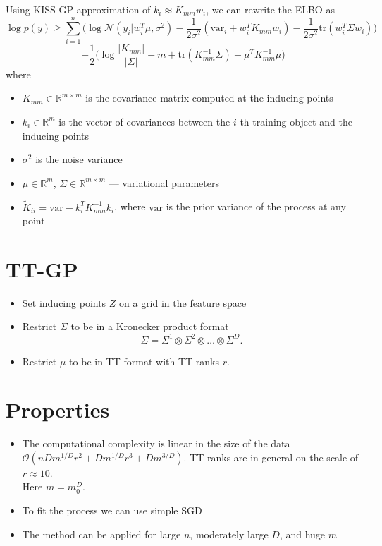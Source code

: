 \documentclass[a0,portrait]{a0poster}
\newcommand{\R}{\mathbb{R}}
\newcommand{\N}{\mathcal{N}}
\newcommand{\bigO}{\mathcal{O}}
\newcommand{\tr}{\mbox{tr}}
\begin{document}
\begin{multicols}{2}
Using KISS-GP approximation of $k_i \approx K_{mm} w_i$, we can rewrite the 
ELBO as
\[
  \log p(y) \ge \sum_{i=1}^n \bigg(\log \N (y_i | w_i^T \mu, \sigma^2) - 
  \frac 1 {2 \sigma^2} (\mbox{var}_i + w_i^T K_{mm} w_i) -\frac 1 {2 \sigma^2} 
    \tr (w_i^T \Sigma w_i)\bigg)
\]
\[
  - \frac 1 2 \bigg(\log \frac {|K_{mm}|} {|\Sigma|} - m + \tr(K_{mm}^{-1} \Sigma)
  + \mu^T K_{mm}^{-1}\mu \bigg)
\]
where
\begin{itemize}
  \item $K_{mm} \in \R^{m \times m}$ is the covariance matrix computed at the
    inducing points
  \item $k_i \in \R^m$ is the vector of covariances between the $i$-th training
    object and the inducing points
  \item $\sigma^2$ is the noise variance
  \item $\mu \in \R^m$, $\Sigma \in \R^{m \times m}$ — variational parameters
  \item $\tilde K_{ii} = \mbox{var} - k_i^T K_{mm}^{-1} k_i$, where  
    $\mbox{var}$ is the prior variance of the process at any point
\end{itemize}

\section*{\LARGE \color{NavyBlue}TT-GP}

\begin{itemize}
  \item Set inducing points $Z$ on a grid in the feature space
  \item Restrict $\Sigma$ to be in a Kronecker product format
    \[
      \Sigma = \Sigma^1 \otimes \Sigma^2\otimes \ldots \otimes \Sigma^D.
    \]
  \item Restrict $\mu$ to be in TT format with TT-ranks $r$.
\end{itemize}

\section*{\LARGE \color{NavyBlue} Properties}
    
\begin{itemize}
  \item The computational complexity is linear in the size of the data
    $\bigO(n D m^{1 / D} r^2 + D m^{1 / D} r^3 + D m^{3 / D})$. 
    TT-ranks are in general on the scale of $r \approx 10$.\\ 
    Here $m = m_0^D$.
  \item To fit the process we can use simple SGD
  \item The method can be applied for large $n$, moderately large $D$,
    and huge $m$
\end{itemize}


\end{multicols}
\end{document}
